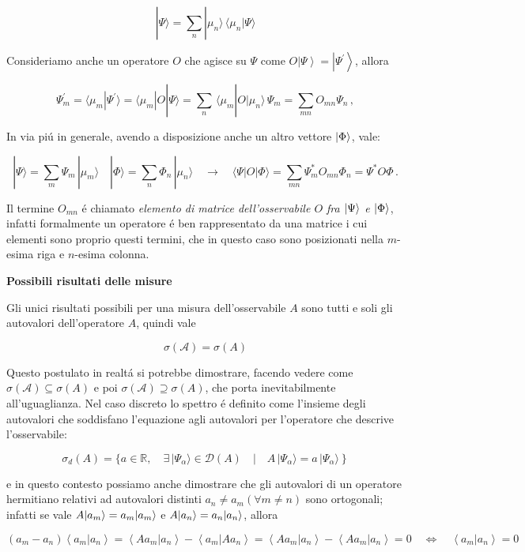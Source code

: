$$|\Psi\rangle=\sum_{n}|\mu_{n}\rangle\,\langle\mu_{n}|\Psi\rangle$$

Consideriamo anche un operatore $O$ che agisce su $\Psi$ come $O\left|\Psi\right\rangle=\left|\Psi^{\prime}\right\rangle$, allora

$$\Psi_{m}^{\prime}=\langle\mu_{m}|\Psi^{\prime}\rangle=\langle\mu_{m}|O|\Psi\rangle=\sum_{n}\,\langle\mu_{m}|O|\mu_{n}\rangle\,\Psi_{m}=\sum_{m n}O_{m n}\Psi_{n}\,,$$

In via pi\'u in generale, avendo a disposizione anche un altro vettore $\ket{\Phi}$, vale:

$$|\Psi\rangle=\sum_{m}\Psi_{m}\,|\mu_{m}\rangle\quad|\Phi\rangle=\sum_{n}\Phi_{n}\,|\mu_{n}\rangle\quad\longrightarrow\quad\langle\Psi|O|\Phi\rangle=\sum_{m n}\Psi_{m}^{*}O_{m n}\Phi_{n}=\Psi^{*}O\Phi\,.$$

Il termine $O_{mn}$ \'e chiamato \textit{elemento di matrice dell'osservabile $O$ fra $\ket{\Psi}$ e $\ket{\Phi}$}, infatti formalmente un operatore \'e ben rappresentato da una matrice i cui elementi sono proprio questi termini, che in questo caso sono posizionati nella $m$-esima riga e $n$-esima colonna.

\begin{postulato} \textbf{Possibili risultati delle misure}

Gli unici risultati possibili per una misura dell'osservabile $A$ sono tutti e soli gli autovalori dell'operatore $A$, quindi vale

$$\sigma({\mathcal{A}})=\sigma(A)$$
\end{postulato}

Questo postulato in realt\'a si potrebbe dimostrare, facendo vedere come $\sigma(\mathcal{A}) \subseteq \sigma(A)$ e poi $\sigma(\mathcal{A}) \supseteq \sigma(A)$, che porta inevitabilmente all'uguaglianza. Nel caso discreto lo spettro \'e definito come l'insieme degli autovalori che soddisfano l'equazione agli autovalori per l'operatore che descrive l'osservabile:

$$\sigma_{d}(A)=\{a\in\mathbb{R},\quad\exists\,|\Psi_{\alpha}\rangle\in\mathcal{D}(A)\quad\left|\quad A\,|\Psi_{\alpha}\rangle=a\,|\Psi_{\alpha}\rangle\right\}$$

e in questo contesto possiamo anche dimostrare che gli autovalori di un operatore hermitiano relativi ad autovalori distinti $a_n \neq a_m (\forall m \neq n)$ sono ortogonali; infatti se vale $A \ket{a_m} = a_m\ket{a_m}$ e $A \ket{a_n} = a_n \ket{a_n}$, allora

$$\left(a_{m}-a_{n}\right)\left\langle a_{m}|a_{n}\right\rangle=\left\langle Aa_{m}|a_{n}\right\rangle-\left\langle a_{m}|Aa_{n}\right\rangle=\left\langle Aa_{m}|a_{n}\right\rangle-\left\langle Aa_{m}|a_{n}\right\rangle=0\quad\Longleftrightarrow\quad\left\langle a_{m}|a_{n}\right\rangle=0$$

